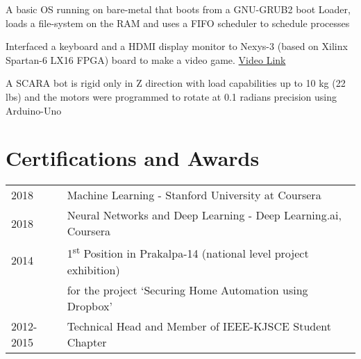 \documentclass[]{deedy_format_Anmol}
\begin{document}
\begin{minipage}[t]{0.66\textwidth}
\vspace{1mm}
\justify
\begin{tightemize}
\item A basic OS running on bare-metal that boots from a GNU-GRUB2 boot Loader, loads a file-system on the RAM and uses a FIFO scheduler to schedule processes
\end{tightemize}
\vspace{\topsep}
\sectionsep

\vspace{1mm}
\justify
\begin{tightemize}
\item Interfaced a keyboard and a HDMI display monitor to Nexys-3 (based on Xilinx Spartan-6 LX16 FPGA) board to make a video game.  \href{https://youtu.be/s36H25OkzVQ}{Video Link}
\end{tightemize}
\vspace{\topsep}
\sectionsep

\vspace{1mm}
\justify
\begin{tightemize}  
\item A SCARA bot is rigid only in Z direction with load capabilities up to 10 kg (22 lbs) and the motors were programmed to rotate at 0.1 radians precision using Arduino-Uno
\end{tightemize} 
\vspace{\topsep}
\sectionsep


\section{Certifications and Awards}
\vspace{\topsep} %
\vspace{1mm}
\justify
\begin{tabular}{ll}
2018 & Machine Learning - Stanford University at Coursera \\
2018 & Neural Networks and Deep Learning - Deep Learning.ai, Coursera \\
2014 & 1\textsuperscript{st} Position in Prakalpa-14 (national level project exhibition) \\
& for the project `Securing Home Automation using Dropbox'\\
2012-2015 & Technical Head and Member of IEEE-KJSCE Student Chapter \\
\end{tabular}

\end{minipage} 
\end{document}
